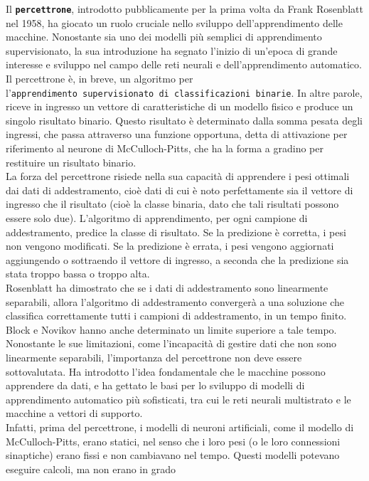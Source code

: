 \documentclass[
  letterpaper,
  DIV=11,
  numbers=noendperiod]{scrreprt}
\begin{document}
Il \textbf{\texttt{percettrone}}, introdotto pubblicamente per la prima
volta da Frank Rosenblatt nel 1958, ha giocato un ruolo cruciale nello
sviluppo dell'apprendimento delle macchine. Nonostante sia uno dei
modelli più semplici di apprendimento supervisionato, la sua
introduzione ha segnato l'inizio di un'epoca di grande interesse e
sviluppo nel campo delle reti neurali e dell'apprendimento automatico.\\
Il percettrone è, in breve, un algoritmo per
l'\texttt{apprendimento\ supervisionato\ di\ classificazioni\ binarie}.
In altre parole, riceve in ingresso un vettore di caratteristiche di un
modello fisico e produce un singolo risultato binario. Questo risultato
è determinato dalla somma pesata degli ingressi, che passa attraverso
una funzione opportuna, detta di attivazione per riferimento al neurone
di McCulloch-Pitts, che ha la forma a gradino per restituire un
risultato binario.\\
La forza del percettrone risiede nella sua capacità di apprendere i pesi
ottimali dai dati di addestramento, cioè dati di cui è noto
perfettamente sia il vettore di ingresso che il risultato (cioè la
classe binaria, dato che tali risultati possono essere solo due).
L'algoritmo di apprendimento, per ogni campione di addestramento,
predice la classe di risultato. Se la predizione è corretta, i pesi non
vengono modificati. Se la predizione è errata, i pesi vengono aggiornati
aggiungendo o sottraendo il vettore di ingresso, a seconda che la
predizione sia stata troppo bassa o troppo alta.\\
Rosenblatt ha dimostrato che se i dati di addestramento sono linearmente
separabili, allora l'algoritmo di addestramento convergerà a una
soluzione che classifica correttamente tutti i campioni di
addestramento, in un tempo finito. Block e Novikov hanno anche
determinato un limite superiore a tale tempo. Nonostante le sue
limitazioni, come l'incapacità di gestire dati che non sono linearmente
separabili, l'importanza del percettrone non deve essere sottovalutata.
Ha introdotto l'idea fondamentale che le macchine possono apprendere da
dati, e ha gettato le basi per lo sviluppo di modelli di apprendimento
automatico più sofisticati, tra cui le reti neurali multistrato e le
macchine a vettori di supporto.\\
Infatti, prima del percettrone, i modelli di neuroni artificiali, come
il modello di McCulloch-Pitts, erano statici, nel senso che i loro pesi
(o le loro connessioni sinaptiche) erano fissi e non cambiavano nel
tempo. Questi modelli potevano eseguire calcoli, ma non erano in grado
\end{document}
